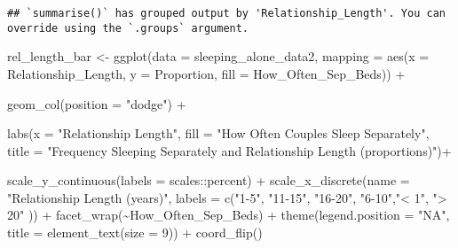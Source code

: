 \documentclass[
]{article}
\newenvironment{Shaded}{\begin{snugshade}}{\end{snugshade}}
\newcommand{\AttributeTok}[1]{\textcolor[rgb]{0.77,0.63,0.00}{#1}}
\newcommand{\DecValTok}[1]{\textcolor[rgb]{0.00,0.00,0.81}{#1}}
\newcommand{\FunctionTok}[1]{\textcolor[rgb]{0.00,0.00,0.00}{#1}}
\newcommand{\NormalTok}[1]{#1}
\newcommand{\OtherTok}[1]{\textcolor[rgb]{0.56,0.35,0.01}{#1}}
\newcommand{\SpecialCharTok}[1]{\textcolor[rgb]{0.00,0.00,0.00}{#1}}
\newcommand{\StringTok}[1]{\textcolor[rgb]{0.31,0.60,0.02}{#1}}
\begin{document}
\begin{verbatim}
## `summarise()` has grouped output by 'Relationship_Length'. You can override using the `.groups` argument.
\end{verbatim}

\begin{Shaded}
\begin{Highlighting}[]
\NormalTok{rel\_length\_bar }\OtherTok{\textless{}{-}} \FunctionTok{ggplot}\NormalTok{(}\AttributeTok{data =}\NormalTok{ sleeping\_alone\_data2,}
                            \AttributeTok{mapping =} \FunctionTok{aes}\NormalTok{(}\AttributeTok{x =}\NormalTok{ Relationship\_Length,}
                                          \AttributeTok{y =}\NormalTok{ Proportion, }
                                          \AttributeTok{fill =}\NormalTok{ How\_Often\_Sep\_Beds)) }\SpecialCharTok{+}
  
                     \FunctionTok{geom\_col}\NormalTok{(}\AttributeTok{position =} \StringTok{"dodge"}\NormalTok{) }\SpecialCharTok{+} 
  
                     \FunctionTok{labs}\NormalTok{(}\AttributeTok{x =} \StringTok{"Relationship Length"}\NormalTok{,}
                          \AttributeTok{fill =} \StringTok{"How Often Couples Sleep Separately"}\NormalTok{, }
                          \AttributeTok{title =} \StringTok{"Frequency Sleeping Separately and Relationship Length (proportions)"}\NormalTok{)}\SpecialCharTok{+}
  
                    \FunctionTok{scale\_y\_continuous}\NormalTok{(}\AttributeTok{labels =}\NormalTok{ scales}\SpecialCharTok{::}\NormalTok{percent) }\SpecialCharTok{+}
                    \FunctionTok{scale\_x\_discrete}\NormalTok{(}\AttributeTok{name =} \StringTok{"Relationship Length (years)"}\NormalTok{, }\AttributeTok{labels =} \FunctionTok{c}\NormalTok{(}\StringTok{"1{-}5"}\NormalTok{, }\StringTok{"11{-}15"}\NormalTok{, }\StringTok{"16{-}20"}\NormalTok{, }\StringTok{"6{-}10"}\NormalTok{,}\StringTok{"\textless{} 1"}\NormalTok{, }\StringTok{"\textgreater{} 20"}\NormalTok{ )) }\SpecialCharTok{+}
                    \FunctionTok{facet\_wrap}\NormalTok{(}\SpecialCharTok{\textasciitilde{}}\NormalTok{How\_Often\_Sep\_Beds) }\SpecialCharTok{+}
                    \FunctionTok{theme}\NormalTok{(}\AttributeTok{legend.position =} \StringTok{"NA"}\NormalTok{, }
                          \AttributeTok{title =} \FunctionTok{element\_text}\NormalTok{(}\AttributeTok{size =} \DecValTok{9}\NormalTok{)) }\SpecialCharTok{+}
                    \FunctionTok{coord\_flip}\NormalTok{()}
\end{Highlighting}
\end{Shaded}
\end{document}
